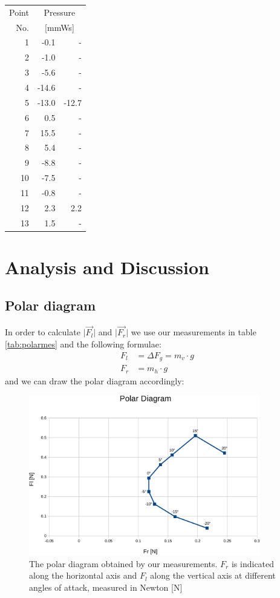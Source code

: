 \documentclass{scrreprt}
\begin{document}
\begin{table}[H]
\centering
\begin{tabular}{|r|r|r|}
\hline
Point & \multicolumn{2}{c|}{Pressure}\\
No. &  \multicolumn{2}{c|}{[mmWs]} \\
\hline\hline
1 & -0.1 & -\\
2 & -1.0 & -\\
3 & -5.6 & -\\
4 & -14.6 & -\\
5 & -13.0 & -12.7 \\
6 & 0.5 & -\\
\hline
7 & 15.5 & -\\
\hline
8 & 5.4 & -\\
9 & -8.8 & -\\
10 & -7.5 & -\\
11 & -0.8 & -\\
12 & 2.3 & 2.2\\
13 & 1.5 & -\\
\hline
\end{tabular}
\end{table}

\section{Analysis and Discussion}
\subsection{Polar diagram}
In order to calculate $\lvert \vec{F_l}\rvert$ and $\lvert \vec{F_r}\rvert$ we use our measurements in table \ref{tab:polarmes} and the following formulae:
\begin{align}
F_l &= \Delta F_g = m_v \cdot g\label{eq:liftweighing}\\
F_r &= m_h \cdot g
\end{align}
and we can draw the polar diagram accordingly:

\begin{figure}[H]
	\centering
  \includegraphics[width=0.9\textwidth]{diag/polar_diag.pdf}
	\caption{The polar diagram obtained by our measurements. $F_r$ is indicated along the horizontal axis and $F_l$ along the vertical axis at different angles of attack, measured in Newton [N]}
	\label{fig:poldiag}
\end{figure}
\end{document}
